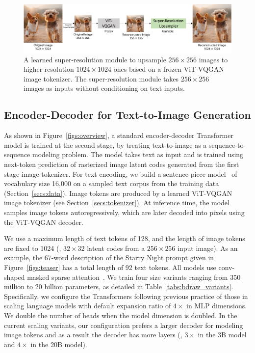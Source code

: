 \begin{figure}[t]
    \centering
    \includegraphics[width=\textwidth]{figures/sr_vit_vqgan.pdf}
    \caption{A learned super-resolution module to upsample \(256\times256\) images to higher-resolution \(1024\times1024\) ones based on a frozen ViT-VQGAN image tokenizer. The super-resolution module takes \(256\times256\) images as inputs without conditioning on text inputs.}
    \label{figs:super_resolution}
\end{figure}

\subsection{Encoder-Decoder for Text-to-Image Generation}


As shown in Figure~\ref{figs:overview}, a standard encoder-decoder Transformer model is trained at the second stage, by treating text-to-image as a sequence-to-sequence modeling problem. The model takes text as input and is trained using next-token prediction of rasterized image latent codes generated from the first stage image tokenizer. For text encoding, we build a sentence-piece model~\cite{sennrich2015neural, kudo2018sentencepiece} of vocabulary size 16,000 on a sampled text corpus from the training data (Section~\ref{secs:data}). Image tokens are produced by a learned ViT-VQGAN image tokenizer (see Section~\ref{secs:tokenizer}). At inference time, the model samples image tokens autoregressively, which are later decoded into pixels using the ViT-VQGAN decoder.

We use a maximum length of text tokens of 128, and the length of image tokens are fixed to 1024 (\ie, \(32{\times}32\) latent codes from a \(256\times256\) input image). As an example, the 67-word description of the Starry Night prompt given in Figure~\ref{figs:teaser} has a total length of 92 text tokens. All models use conv-shaped masked sparse attention~\cite{child2019generating}. We train four size variants ranging from 350 million to 20 billion parameters, as detailed in Table~\ref{tabs:bdraw_variants}. Specifically, we configure the Transformers following previous practice of those in scaling language models with default expansion ratio of \(4\times\) in MLP dimensions. We double the number of heads when the model dimension is doubled. In the current scaling variants, our configuration prefers a larger decoder for modeling image tokens and as a result the decoder has more layers (\eg, \(3\times\) in the 3B model and \(4\times\) in the 20B model).

